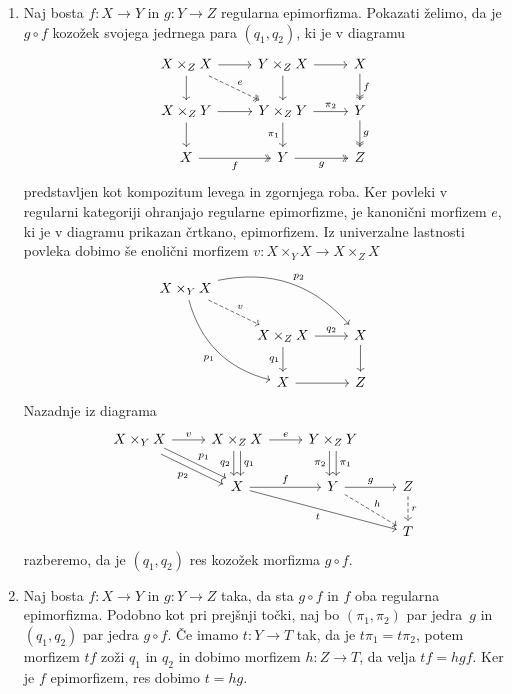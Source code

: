 \documentclass[../kategoricna_logika.tex]{subfiles}
\begin{document}
\begin{dokaz}
\begin{enumerate}[label=(\roman*)]
  \item %
    Naj bosta $f : X \to Y$ in $g : Y \to Z$ regularna epimorfizma.
    Pokazati želimo, da je $g \circ f$ kozožek svojega jedrnega para
    $(q_1, q_2)$, ki je v diagramu
    \begin{equation*}
      \begin{tikzcd}[column sep=normal]
        X \times_Z X \ar[d] \ar[r] \ar[dr, dashed, two heads, "e"]  & Y \times_Z X \ar[d ] \ar[r] & X \ar[d, two heads, "f"] \\
        X \times_Z Y \ar[d] \ar[r] & Y \times_Z Y \ar[d, "\pi_1"'] \ar[r, "\pi_2"] & Y \ar[d, two heads, "g"] \\
        X \ar[r, two heads, "f"'] & Y \ar[r, two heads, "g"'] & Z
      \end{tikzcd}
    \end{equation*}
    predstavljen kot kompozitum levega in zgornjega roba.  Ker povleki
    v regularni kategoriji ohranjajo regularne epimorfizme, je
    kanonični morfizem $e$, ki je v diagramu prikazan črtkano,
    epimorfizem.  Iz univerzalne lastnosti povleka dobimo še enolični
    morfizem $v : X \times_Y X \to X \times_Z X$
    \begin{equation*}
      \begin{tikzcd}[column sep=normal, row sep=normal]
        X \times_Y X \ar[ddr, bend right, "p_1"'] \ar[drr, bend left, "p_2"] \ar[dr, dashed, "v"] & & \\
        & X \times_Z X \ar[d, "q_1"'] \ar[r, "q_2"] & X \ar[d] \\
        & X \ar[r] & Z
      \end{tikzcd}
    \end{equation*}
    Nazadnje iz diagrama
    \begin{equation*}
      \begin{tikzcd}
        X \times_Y X \ar[dr, shift left, "p_1"] \ar[dr, shift right,
        "p_2"'] \ar[r, "v"] & X \times_Z X \ar[d, shift left, "q_1"]
        \ar[d, shift right, "q_2"'] \ar[r, "e"] &
        Y \times_Z Y \ar[d, shift left, "\pi_1"] \ar[d, shift right, "\pi_2"'] &  \\
        & X \ar[r, "f"] \ar[drr, "t"'] & Y \ar[r, "g"] \ar[dr, dashed, "h"] & Z \ar[d, dashed, "r"] \\
        & & & T
      \end{tikzcd}
    \end{equation*}
    razberemo, da je $(q_1, q_2)$ res kozožek morfizma $g \circ f$.

  \item %
    Naj bosta $f : X \to Y$ in $g : Y \to Z$ taka, da sta $g \circ f$
    in $f$ oba regularna epimorfizma.  Podobno kot pri prejšnji točki,
    naj bo $(\pi_1, \pi_2)$ par jedra~$g$ in $(q_1, q_2)$ par jedra
    $g \circ f$.  Če imamo $t : Y \to T$ tak, da je
    $t \pi_1 = t \pi_2$, potem morfizem $tf$ zoži $q_1$ in $q_2$ in
    dobimo morfizem $h : Z \to T$, da velja $t f = h g f$. Ker je $f$
    epimorfizem, res dobimo $t = h g$.
  \end{enumerate}
\end{dokaz}
\end{document}
